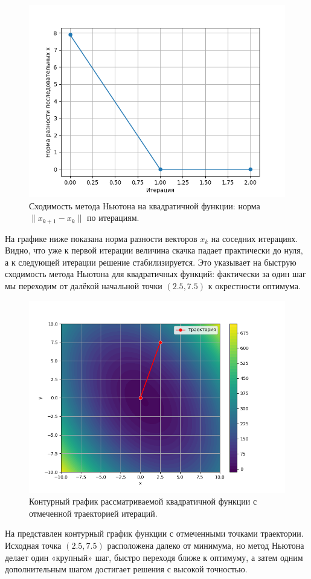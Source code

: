 \documentclass[a4paper,12pt]{article}
\begin{document}
\begin{figure}[H]
    \centering
    \includegraphics[width=\textwidth]{images/quad_convergence.png}
    \caption{Сходимость метода Ньютона на квадратичной функции: норма \(\|x_{k+1} - x_k\|\) по итерациям.}
\end{figure}
\noindent На графике ниже показана норма разности векторов \(x_k\) на соседних итерациях. Видно, что уже к первой итерации величина скачка падает практически до нуля, а к следующей итерации решение стабилизируется. Это указывает на быструю сходимость метода Ньютона для квадратичных функций: фактически за один шаг мы переходим от далёкой начальной точки \((2.5, 7.5)\) к окрестности оптимума.

\begin{figure}[H]
    \centering
    \includegraphics[width=\textwidth]{images/quad_contour.png}
    \caption{Контурный график рассматриваемой квадратичной функции с отмеченной траекторией итераций.}
\end{figure}
\noindent На  представлен контурный график функции с отмеченными точками траектории. Исходная точка \((2.5, 7.5)\) расположена далеко от минимума, но метод Ньютона делает один «крупный» шаг, быстро переходя ближе к оптимуму, а затем одним дополнительным шагом достигает решения с высокой точностью. 
\end{document}
